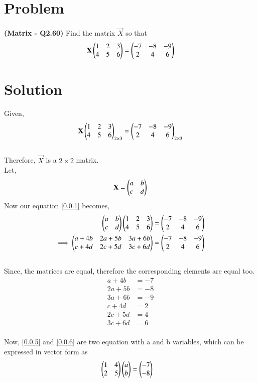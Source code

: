 \documentclass[journal,12pt,twocolumn]{IEEEtran}
\begin{document}
\section*{\textbf{Problem}}
\textbf{(Matrix - Q2.60)} Find the matrix $\vec{X}$ so that 
$$\mathbf{X}\begin{pmatrix}1 & 2 & 3\\ 4 & 5 & 6\end{pmatrix} = \begin{pmatrix}-7 & -8 & -9\\ 2 & 4 &6\end{pmatrix}$$
\section*{\textbf{Solution}}
Given,
\begin{align}
    \mathbf{X}\begin{pmatrix}1 & 2 & 3\\ 4 & 5 & 6\end{pmatrix}_{2 \times 3} = \begin{pmatrix}-7 & -8 & -9\\ 2 & 4 &6\end{pmatrix}_{2 \times 3}\label{0.0.1}
\end{align}\\
Therefore,
$\vec{X}$ is a $2 \times 2$ matrix.\\
Let,
\begin{align}
\mathbf{X} = \begin{pmatrix}a & b \\ c & d\end{pmatrix}    
\end{align}
Now our equation \eqref{0.0.1} becomes, 
\begin{align}
  \begin{pmatrix}a & b \\ c & d\end{pmatrix} \begin{pmatrix}1 & 2 & 3\\ 4 & 5 & 6\end{pmatrix} &= \begin{pmatrix}-7 & -8 & -9\\ 2 & 4 &  6\end{pmatrix} \\
  \implies \begin{pmatrix}a+4b & 2a+5b & 3a+6b\\ c+4d & 2c+5d & 3c+6d\end{pmatrix} &= \begin{pmatrix}-7 & -8 & -9\\ 2 & 4 &6\end{pmatrix} 
\end{align}\\
Since, the matrices are equal, therefore the corresponding elements are equal too.
\begin{align}
    a + 4b &= -7 \label{0.0.5}\\
    2a + 5b &= -8 \label{0.0.6}\\
    3a + 6b &= -9\\
    c + 4d &= 2 \label{0.0.8}\\
    2c + 5d &= 4 \label{0.0.9}\\
    3c + 6d &= 6
\end{align}\\
Now, \eqref{0.0.5} and \eqref{0.0.6} are two equation with a and b variables, which can be expressed in vector form as 
\begin{align}
    \begin{pmatrix}1 & 4 \\ 2 & 5\end{pmatrix}\begin{pmatrix}a \\ b\end{pmatrix} &= \begin{pmatrix}-7 \\ -8\end{pmatrix}
\end{align}\\
\end{document}
